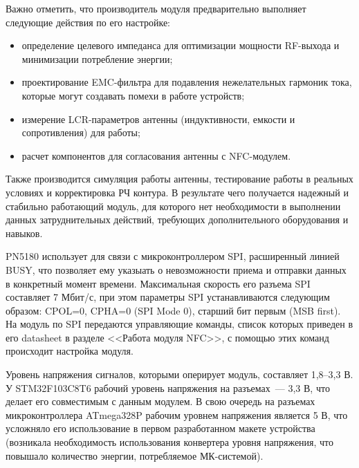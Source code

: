 %

Важно отметить, что производитель модуля предварительно выполняет следующие действия по его настройке:
\begin{itemize}
    \item определение целевого импеданса для оптимизации мощности RF-выхода и минимизации потребление энергии;
    \item проектирование EMC-фильтра для подавления нежелательных гармоник тока, которые могут создавать помехи в работе устройств;
    \item измерение LCR-параметров антенны (индуктивности, емкости и сопротивления) для работы;
    \item расчет компонентов для согласования антенны с NFC-модулем.
\end{itemize}

Также производится симуляция работы антенны, тестирование работы в реальных условиях и корректировка РЧ контура.
В результате чего получается надежный и стабильно работающий модуль, для которого нет необходимости в выполнении данных затруднительных действий, требующих дополнительного оборудования и навыков.


PN5180 использует для связи с микроконтроллером SPI, расширенный линией BUSY, что позволяет ему указыать о невозможности приема и отправки данных в конкретный момент времени.
Максимальная скорость его разъема SPI составляет 7 Мбит/с, при этом параметры SPI устанавливаются следующим образом: CPOL=0, CPHA=0 (SPI Mode 0), старший бит первым (MSB first).
На модуль по SPI передаются управляющие команды, список которых приведен в его datasheet в разделе <<Работа модуля NFC>>, с помощью этих команд происходит настройка модуля\cite{pn5180_datasheet}.

Уровень напряжения сигналов, которыми оперирует модуль, составляет 1,8--3,3 В.
У STM32F103C8T6 рабочий уровень напряжения на разъемах~--- 3,3 В, что делает его совместимым с данным модулем.
В свою очередь на разъемах микроконтроллера ATmega328P рабочим уровнем напряжения является 5 В, что усложняло его использование в первом разработанном макете устройства (возникала необходимость использования конвертера уровня напряжения, что повышало количество энергии, потребляемое МК-системой).


